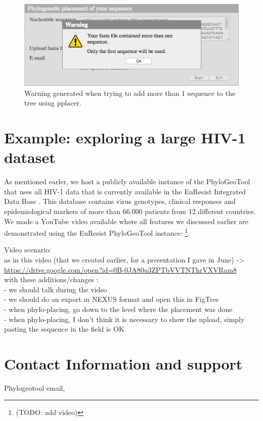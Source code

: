 \documentclass[a4paper, 11pt]{article} %
\begin{document}
\begin{figure}[H]
\centering
\includegraphics[scale=0.50]{images/pplacer-warning.png}
\vspace{-0.25cm}
\caption{Warning generated when trying to add more than 1 sequence to the tree using pplacer.}
\label{fig:pplacer-warning}
\end{figure}



\section{Example: exploring a large HIV-1 dataset}

As mentioned earler, we host a publicly available instance of the PhyloGeoTool that uses all HIV-1 data that is currently available in the EuResist Integrated Data Base \cite{Zazzi2012}. 
This database contains virus genotypes, clinical responses and epidemiological markers of more than 66.000 patients from 12 different countries.
We made a YouTube video available where all features we discussed earlier are demonstrated using the EuResist PhyloGeoTool instance: \footnote{(TODO: add video)}.

Video scenario:\\
 as in this video (that we created earlier, for a presentation I gave in June) -> \url{https://drive.google.com/open?id=0B-0JA80u3ZPTbVVTNThrVXVRam8} \\
 with these additions/changes :\\  
 - we should talk during the video \\
 - we should do an export in NEXUS format and open this in FigTree \\
 - when phylo-placing, go down to the level where the placement was done\\
 - when phylo-placing, I don't think it is necessary to show the upload, simply pasting the sequence in the field is OK \\



\section{Contact Information and support }

Phylogeotool email, 






\end{document}
